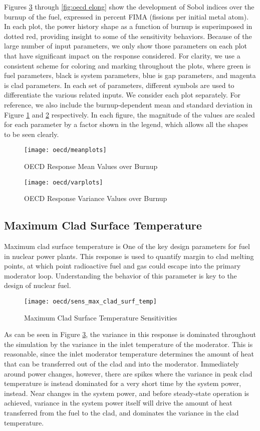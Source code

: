 Figures \ref{fig:oecd clad temp} through \ref{fig:oecd elong} show the development of Sobol indices over the burnup
of the fuel, expressed in percent FIMA (fissions per initial metal atom).  In each plot, the power history
shape as a function of burnup is superimposed in dotted red, providing insight to some of the sensitivity
behaviors.  
Because of the large number of input parameters, we only show those parameters on each plot that
have significant impact on the response considered.  For clarity, we use a consistent scheme for coloring and
marking throughout the plots, where green is fuel parameters, black is system parameters, blue is gap
parameters, and magenta is clad parameters.  In each set of parameters, different symbols are used to
differentiate the various related inputs.  We consider each plot separately.  For reference, we also include
the burnup-dependent mean and standard deviation in Figure \ref{fig:oecd mean} and \ref{fig:oecd var}
respectively.  
In each figure, the magnitude of the values are scaled for each parameter by a factor
shown in the legend, which allows all the shapes to be seen clearly.
\begin{figure}[htb]
  \centering
  \texttt{[image: oecd/meanplots]}
  \caption{OECD Response Mean Values over Burnup}
  \label{fig:oecd mean}
\end{figure}
\begin{figure}[H]
  \centering
  \texttt{[image: oecd/varplots]}
  \caption{OECD Response Variance Values over Burnup}
  \label{fig:oecd var}
\end{figure}

\subsection{Maximum Clad Surface Temperature}
Maximum clad surface temperature is One of the key design parameters for fuel in nuclear power plants.
This response is
used to quantify margin to clad melting points, at which point radioactive fuel and gas could escape into
the primary moderator loop.  Understanding the behavior of this parameter is key to the design of nuclear
fuel.
\begin{figure}[H]
  \centering
  \texttt{[image: oecd/sens\_max\_clad\_surf\_temp]}
  \caption{Maximum Clad Surface Temperature Sensitivities}
  \label{fig:oecd clad temp}
\end{figure}
As can be seen in Figure \ref{fig:oecd clad temp}, the variance in this response is dominated throughout the
simulation by the variance in the inlet temperature of the moderator.  
This is reasonable, since the inlet moderator temperature determines the
amount of heat that can be transferred out of the clad and into the moderator.
Immediately around power changes,
however, there are spikes where the variance in peak clad temperature is instead dominated for a very short
time by the system power, instead.  
Near changes in the
system power, and before steady-state operation is achieved, variance in the system power itself will drive
the amount of heat transferred from the fuel to the clad, and dominates the variance in the clad temperature.

